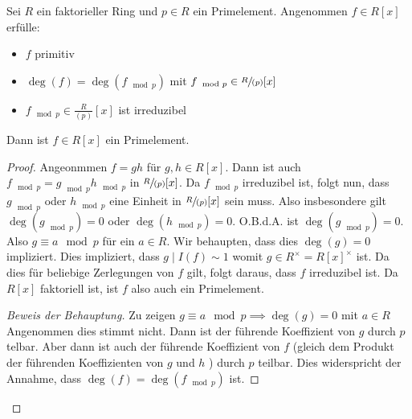 \begin{proposition}
	Sei $R$ ein faktorieller Ring und $p \in R$ ein Primelement.
	Angenommen $f \in R[x]$ erfülle:
	\begin{itemize}
		\item $f$ primitiv
		\item $\deg(f) = \deg(f_{\mod p})$ mit $f_{\mod p} \in \sfrac{R}{(p)}[x]$
		\item $f_{\mod p} \in \frac{R}{(p)} [x]$ ist irreduzibel
	\end{itemize}
	Dann ist $f \in R[x]$ ein Primelement.
\end{proposition}

\begin{proof}
	Angeonmmen $f = gh$ für $g,h \in R[x]$.
	Dann ist auch $f_{\mod p} = g_{\mod p} h_{\mod p}$ in $\sfrac{R}{(p)}[x]$.
	Da $f_{\mod p}$ irreduzibel ist, folgt nun, dass $g_{\mod p}$ oder $h_{\mod p}$ eine Einheit in $\sfrac{R}{(p)}[x]$ sein muss.
	Also insbesondere gilt $\deg(g_{\mod p}) = 0$ oder $\deg(h_{\mod p}) = 0$.
	O.B.d.A. ist $\deg(g_{\mod p}) = 0$. Also $g \equiv a \mod p$ für ein $a \in R$.
	Wir behaupten, dass dies $\deg(g)= 0$ impliziert.
	Dies impliziert, dass $g \mid I(f) \sim 1$ womit $g \in R^{\times} = R[x]^{\times}$ ist.
	Da dies für beliebige Zerlegungen von $f$ gilt, folgt daraus, dass $f$ irreduzibel ist.
	Da  $R[x]$ faktoriell ist, ist $f$ also auch ein Primelement.

	\begin{proof}[Beweis der Behauptung]
		Zu zeigen $g \equiv a \mod p \implies \deg(g) = 0$ mit $a \in R$ \\
		Angenommen dies stimmt nicht. Dann ist der führende Koeffizient von $g$ durch $p$ telbar.
		Aber dann ist auch der führende Koeffizient von $f$ (gleich dem Produkt der führenden Koeffizienten von $g$ und $h$ )
		durch $p$ teilbar. Dies widerspricht der Annahme, dass $\deg(f) = \deg(f_{\mod p})$ ist.
	\end{proof}
\end{proof}

